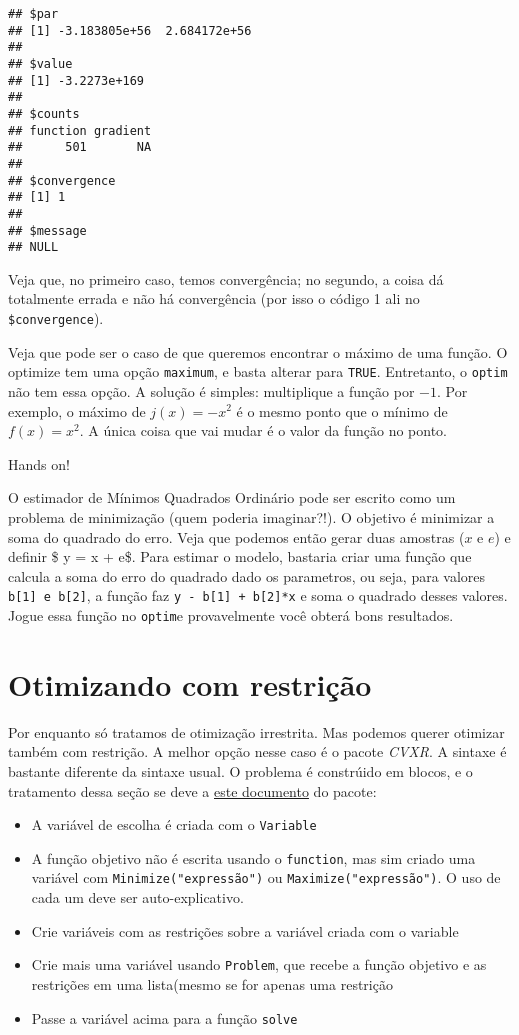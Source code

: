 \documentclass[
]{book}
\providecommand{\tightlist}{%
  \setlength{\itemsep}{0pt}\setlength{\parskip}{0pt}}
\begin{document}
\begin{verbatim}
## $par
## [1] -3.183805e+56  2.684172e+56
## 
## $value
## [1] -3.2273e+169
## 
## $counts
## function gradient 
##      501       NA 
## 
## $convergence
## [1] 1
## 
## $message
## NULL
\end{verbatim}

Veja que, no primeiro caso, temos convergência; no segundo, a coisa dá totalmente errada e não há convergência (por isso o código 1 ali no \texttt{\$convergence}).

Veja que pode ser o caso de que queremos encontrar o máximo de uma função. O optimize tem uma opção \texttt{maximum}, e basta alterar para \texttt{TRUE}. Entretanto, o \texttt{optim} não tem essa opção. A solução é simples: multiplique a função por \(-1\). Por exemplo, o máximo de \(j(x)=- x^2\) é o mesmo ponto que o mínimo de \(f(x)=x^2\). A única coisa que vai mudar é o valor da função no ponto.

Hands on!

O estimador de Mínimos Quadrados Ordinário pode ser escrito como um problema de minimização (quem poderia imaginar?!). O objetivo é minimizar a soma do quadrado do erro. Veja que podemos então gerar duas amostras (\(x\) e \(e\)) e definir \$ y = x + e\$. Para estimar o modelo, bastaria criar uma função que calcula a soma do erro do quadrado dado os parametros, ou seja, para valores \texttt{b{[}1{]}\ e\ b{[}2{]}}, a função faz \texttt{y\ -\ b{[}1{]}\ +\ b{[}2{]}*x} e soma o quadrado desses valores. Jogue essa função no \texttt{optim}e provavelmente você obterá bons resultados.

\hypertarget{otimizando-com-restriuxe7uxe3o}{%
\section{Otimizando com restrição}\label{otimizando-com-restriuxe7uxe3o}}

Por enquanto só tratamos de otimização irrestrita. Mas podemos querer otimizar também com restrição. A melhor opção nesse caso é o pacote \emph{CVXR}. A sintaxe é bastante diferente da sintaxe usual. O problema é constrúido em blocos, e o tratamento dessa seção se deve a \href{https://cran.r-project.org/web/packages/CVXR/vignettes/cvxr_intro.html}{este documento} do pacote:

\begin{itemize}
\tightlist
\item
  A variável de escolha é criada com o \texttt{Variable}
\item
  A função objetivo não é escrita usando o \texttt{function}, mas sim criado uma variável com \texttt{Minimize("expressão")} ou \texttt{Maximize("expressão")}. O uso de cada um deve ser auto-explicativo.
\item
  Crie variáveis com as restrições sobre a variável criada com o variable
\item
  Crie mais uma variável usando \texttt{Problem}, que recebe a função objetivo e as restrições em uma lista(mesmo se for apenas uma restrição
\item
  Passe a variável acima para a função \texttt{solve}
\end{itemize}
\end{document}
